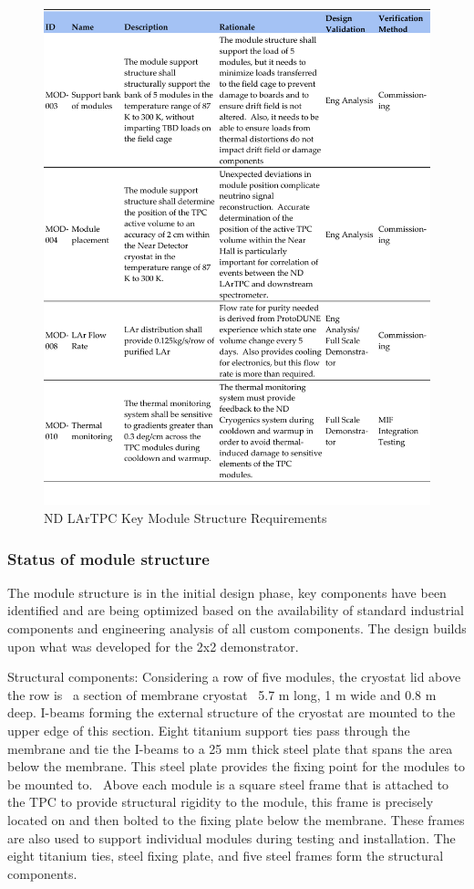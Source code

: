 \begin{figure}
\centering 
\includegraphics[width=1\linewidth]{graphics/lartpc/0Req/NDModreqs1.pdf}
\caption{\label{fig:lartpc-mod-req1} ND LArTPC Key Module Structure Requirements}
\end{figure}


\subsubsection{Status of module structure}
The module structure is in the initial design phase, key components have been identified and are being optimized based on the availability of standard industrial components and engineering analysis of all custom components. 
The design builds upon what was developed for the 2x2 demonstrator. 

Structural components: Considering a row of five modules, the cryostat lid above the row is  a section of membrane cryostat  5.7 m long, 1 m wide and 0.8 m deep. I-beams forming the external structure of the cryostat are mounted to the upper edge of this section. Eight titanium support ties pass through the membrane and tie the I-beams to a 25 mm thick steel plate that spans the area below the membrane. This steel plate provides the fixing point for the modules to be mounted to.  Above each module is a square steel frame that is attached to the TPC to provide structural rigidity to the module, this frame is precisely located on and then bolted to the fixing plate below the membrane. These frames are also used to support individual modules during testing and installation. The eight titanium ties, steel fixing plate, and five steel frames form the structural components. 

